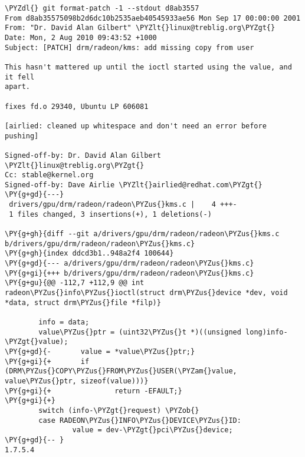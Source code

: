 \begin{Verbatim}[commandchars=\\\{\}]
\PYZdl{} git format-patch -1 --stdout d8ab3557
From d8ab35575098b2d6dc10b2535aeb40545933ae56 Mon Sep 17 00:00:00 2001
From: "Dr. David Alan Gilbert" \PYZlt{}linux@treblig.org\PYZgt{}
Date: Mon, 2 Aug 2010 09:43:52 +1000
Subject: [PATCH] drm/radeon/kms: add missing copy from user

This hasn't mattered up until the ioctl started using the value, and it fell
apart.

fixes fd.o 29340, Ubuntu LP 606081

[airlied: cleaned up whitespace and don't need an error before pushing]

Signed-off-by: Dr. David Alan Gilbert \PYZlt{}linux@treblig.org\PYZgt{}
Cc: stable@kernel.org
Signed-off-by: Dave Airlie \PYZlt{}airlied@redhat.com\PYZgt{}
\PY{g+gd}{---}
 drivers/gpu/drm/radeon/radeon\PYZus{}kms.c |    4 +++-
 1 files changed, 3 insertions(+), 1 deletions(-)

\PY{g+gh}{diff --git a/drivers/gpu/drm/radeon/radeon\PYZus{}kms.c b/drivers/gpu/drm/radeon/radeon\PYZus{}kms.c}
\PY{g+gh}{index ddcd3b1..948a2f4 100644}
\PY{g+gd}{--- a/drivers/gpu/drm/radeon/radeon\PYZus{}kms.c}
\PY{g+gi}{+++ b/drivers/gpu/drm/radeon/radeon\PYZus{}kms.c}
\PY{g+gu}{@@ -112,7 +112,9 @@ int radeon\PYZus{}info\PYZus{}ioctl(struct drm\PYZus{}device *dev, void *data, struct drm\PYZus{}file *filp)}

        info = data;
        value\PYZus{}ptr = (uint32\PYZus{}t *)((unsigned long)info-\PYZgt{}value);
\PY{g+gd}{-       value = *value\PYZus{}ptr;}
\PY{g+gi}{+       if (DRM\PYZus{}COPY\PYZus{}FROM\PYZus{}USER(\PYZam{}value, value\PYZus{}ptr, sizeof(value)))}
\PY{g+gi}{+               return -EFAULT;}
\PY{g+gi}{+}
        switch (info-\PYZgt{}request) \PYZob{}
        case RADEON\PYZus{}INFO\PYZus{}DEVICE\PYZus{}ID:
                value = dev-\PYZgt{}pci\PYZus{}device;
\PY{g+gd}{-- }
1.7.5.4
\end{Verbatim}
